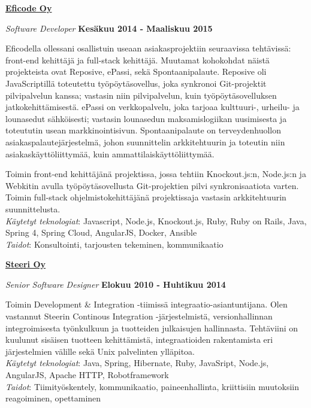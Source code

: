 \documentclass[10pt,finnish,a4paper]{article}
\newenvironment{outerlist}[1][\enskip\textbullet]%
        {\begin{itemize}[#1]}{\end{itemize}%
         \vspace{-.6\baselineskip}}
\newenvironment{innerlist}[1][\enskip\textbullet]%
        {\begin{compactitem}[#1]}{\end{compactitem}}
\newcommand{\blankline}{\quad\pagebreak[2]}
\begin{document}
\href{http://eficode.fi/}{\textbf{Eficode Oy}}
\begin{outerlist}

  \item[] \textit{Software Developer}%
  \hfill \textbf{Kesäkuu 2014 - Maaliskuu 2015}
  \begin{innerlist}
    \item Eficodella ollessani osallistuin useaan asiakasprojektiin seuraavissa tehtävissä: front-end kehittäjä ja full-stack kehittäjä. Muutamat kohokohdat näistä projekteista ovat Reposive, ePassi, sekä Spontaanipalaute.
Reposive oli JavaScriptillä toteutettu työpöytäsovellus, joka synkronoi Git-projektit pilvipalvelun kanssa; vastasin niin pilvipalvelun, kuin työpöytäsovelluksen jatkokehittämisestä.
ePassi on verkkopalvelu, joka tarjoaa kulttuuri-, urheilu- ja lounasedut sähköisesti; vastasin lounasedun maksamislogiikan uusimisesta ja toteututin usean markkinointisivun.
Spontaanipalaute on terveydenhuollon asiakaspalautejärjestelmä, johon suunnittelin arkkitehtuurin ja toteutin niin asiakaskäyttöliittymää, kuin ammattilaiskäyttöliittymää.\\
    \item Toimin front-end kehittäjänä projektissa, jossa tehtiin Knockout.js:n, Node.js:n ja Webkitin avulla työpöytäsovellusta Git-projektien pilvi synkronisaatiota varten.
      Toimin full-stack ohjelmistokehittäjänä projektissaja vastasin arkkitehtuurin suunnittelusta.\\

    \emph{Käytetyt teknologiat}: Javascript, Node.js, Knockout.js, Ruby, Ruby on Rails, Java, Spring 4, Spring Cloud, AngularJS, Docker, Ansible\\
    \emph{Taidot}: Konsultointi, tarjousten tekeminen, kommunikaatio
  \end{innerlist}
\end{outerlist}
\blankline


\href{http://steeri.fi/}{\textbf{Steeri Oy}}
\begin{outerlist}

\item[] \textit{Senior Software Designer}
    \hfill \textbf{Elokuu 2010 - Huhtikuu 2014}
    \begin{innerlist}
		\item Toimin Development \& Integration -tiimissä integraatio-asiantuntijana. Olen vastannut Steerin Continous Integration -järjestelmistä, versionhallinnan integroimisesta työnkulkuun ja tuotteiden julkaisujen hallinnasta. Tehtäviini on kuulunut sisäisen tuotteen kehittämistä, integraatioiden rakentamista eri järjestelmien välille sekä Unix palvelinten ylläpitoa.\\


         \emph{Käytetyt teknologiat}: Java, Spring, Hibernate, Ruby, JavaSript, Node.js, AngularJS, Apache HTTP, Robotframework\\
         \emph{Taidot}: Tiimityöskentely, kommunikaatio, paineenhallinta, kriittisiin muutoksiin reagoiminen, opettaminen
    \end{innerlist}
\end{outerlist}
\blankline
\end{document}
